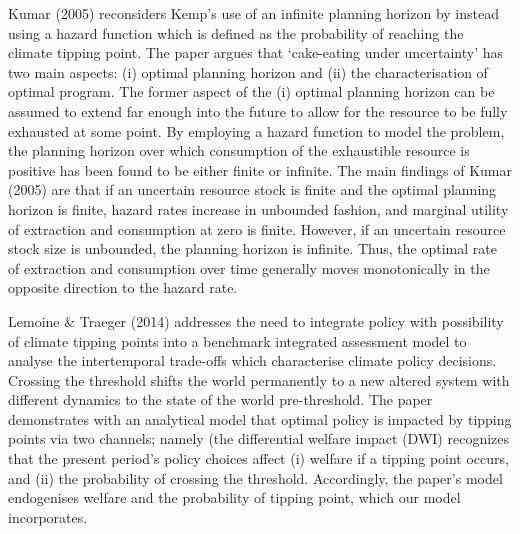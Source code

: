 \documentclass[11pt,preprint, authoryear]{elsarticle}
\numberwithin{equation}{section}
\numberwithin{figure}{section}
\numberwithin{table}{section}
\begin{document}
Kumar (2005) reconsiders Kemp's use of an infinite planning horizon by
instead using a hazard function which is defined as the probability of
reaching the climate tipping point. The paper argues that `cake-eating
under uncertainty' has two main aspects: (i) optimal planning horizon
and (ii) the characterisation of optimal program. The former aspect of
the (i) optimal planning horizon can be assumed to extend far enough
into the future to allow for the resource to be fully exhausted at some
point. By employing a hazard function to model the problem, the planning
horizon over which consumption of the exhaustible resource is positive
has been found to be either finite or infinite. The main findings of
Kumar (2005) are that if an uncertain resource stock is finite and the
optimal planning horizon is finite, hazard rates increase in unbounded
fashion, and marginal utility of extraction and consumption at zero is
finite. However, if an uncertain resource stock size is unbounded, the
planning horizon is infinite. Thus, the optimal rate of extraction and
consumption over time generally moves monotonically in the opposite
direction to the hazard rate.

Lemoine \& Traeger (2014) addresses the need to integrate policy with
possibility of climate tipping points into a benchmark integrated
assessment model to analyse the intertemporal trade-offs which
characterise climate policy decisions. Crossing the threshold shifts the
world permanently to a new altered system with different dynamics to the
state of the world pre-threshold. The paper demonstrates with an
analytical model that optimal policy is impacted by tipping points via
two channels; namely (the differential welfare impact (DWI) recognizes
that the present period's policy choices affect (i) welfare if a tipping
point occurs, and (ii) the probability of crossing the threshold.
Accordingly, the paper's model endogenises welfare and the probability
of tipping point, which our model incorporates.
\end{document}
